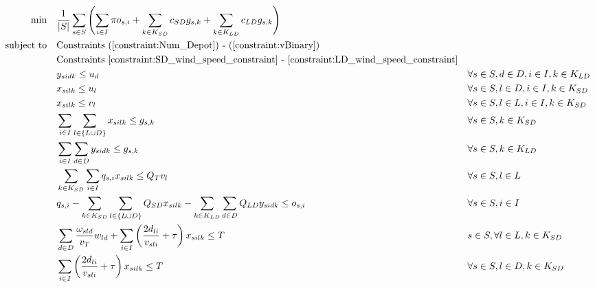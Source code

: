\documentclass[preprint,review,11pt,authoryear]{elsarticle}
\begin{document}
\begin{subequations} \label{formulation:SAA}
    \begin{align}
        \min \quad & \frac{1}{|S|} \sum_{s \in S} \left(\sum_{i \in I} \pi o_{s,i} + \sum_{k \in K_{SD}} c_{SD} g_{s,k} + \sum_{k \in K_{LD}} c_{LD} g_{s,k} \right) && \label{objective:SAAObj} \\
        \subjectto \quad & \text{Constraints (\ref{constraint:Num_Depot}) - (\ref{constraint:vBinary})} && \label{constraint:1stStage_SAA}\\
                        & \text{Constraints \eqref{constraint:SD_wind_speed_constraint} - \eqref{constraint:LD_wind_speed_constraint}} && \label{constraint:wind_speed}\\
                        & y_{sidk} \leq u_d && \forall s \in S , d \in D, i \in I, k \in K_{LD} \label{constraint:DepotOpen1_SAA}\\
                        & x_{silk} \leq u_l && \forall s \in S , l \in D, i \in I, k \in K_{SD} \label{constraint:DepotOpen2_SAA}\\
                        & x_{silk} \leq v_l && \forall s \in S , l \in L, i \in I, k \in K_{SD} \label{constraint:LaunchPointOpen_SAA} \\
                        & \sum_{i \in I} \sum_{l \in \{L \cup D\}} x_{silk} \leq g_{s,k} && \forall s \in S , k \in K_{SD} \label{constraint:SmallDrone_Usage_SAA}\\
                        & \sum_{i \in I} \sum_{d \in D}y_{sidk} \leq g_{s,k} && \forall s \in S , k \in K_{LD} \label{constraint:LargeDrone_Usage_SAA}\\
                        & \sum_{k \in K_{SD}} \sum_{i \in I} q_{s,i} x_{silk} \leq Q_T v_l && \forall s \in S , l \in L \label{constraint:TrucksCapacity_SAA} \\
                        & q_{s,i} - \sum_{k \in K_{SD}}\sum_{l \in \{L \cup D\}} Q_{SD} x_{silk} - \sum_{k \in K_{LD}}\sum_{d \in D} Q_{LD} y_{sidk} \leq o_{s,i} && \forall s \in S , i \in I \label{constraint:UnmetDemand_SAA} \\
                        & \sum_{d \in D} \frac{\omega_{sld}}{v_T} w_{ld} + \sum_{i \in I} \left( \frac{2d_{li}}{v_{sli}} + \tau \right) x_{silk} \leq T && s \in S , \forall l \in L, k \in K_{SD} \label{constraint:LPTimeLimitSD_SAA} \\
                        & \sum_{i \in I} \left( \frac{2d_{li}}{v_{sli}} + \tau \right) x_{silk} \leq T && \forall s \in S , l \in D, k \in K_{SD} \label{constraint:DepotTimeLimitSD_SAA} \\

\end{align}
\end{subequations}
\end{document}
